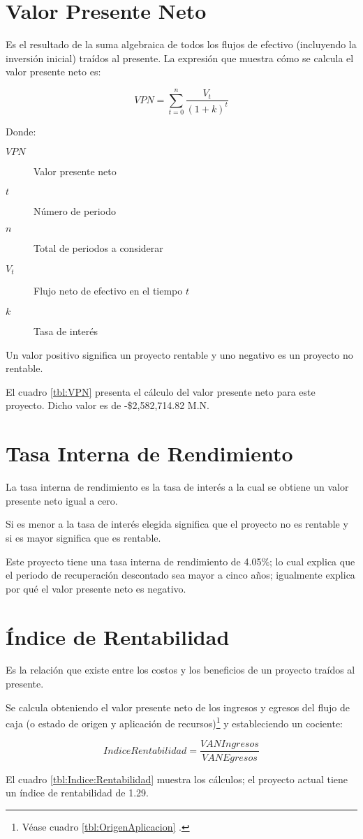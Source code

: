 \section{Valor Presente Neto}

Es el resultado de la suma algebraica de todos los flujos de efectivo (incluyendo la inversión inicial) traídos al presente. La expresión que muestra cómo se calcula el valor presente neto es:

$$VPN = \sum_{t=0}^{n}{\frac{V_t}{\left(1+k\right)^t}}$$

Donde:

\begin{description}
	\item[$VPN$] Valor presente neto
	\item[$t$] Número de periodo
	\item[$n$] Total de periodos a considerar
	\item[$V_t$] Flujo neto de efectivo en el tiempo $t$
	\item[$k$] Tasa de interés
\end{description}

Un valor positivo significa un proyecto rentable y uno negativo es un proyecto no rentable.

El cuadro \ref{tbl:VPN} presenta el cálculo del valor presente neto para este proyecto. Dicho valor es de -\$2,582,714.82 M.N.



\section{Tasa Interna de Rendimiento}

La tasa interna de rendimiento es la tasa de interés a la cual se obtiene un valor presente neto igual a cero.

Si es menor a la tasa de interés elegida significa que el proyecto no es rentable y si es mayor significa que es rentable.

Este proyecto tiene una tasa interna de rendimiento de 4.05\%; lo cual explica que el periodo de recuperación descontado sea mayor a cinco años; igualmente explica por qué el valor presente neto es negativo.

\section{Índice de Rentabilidad}

Es la relación que existe entre los costos y los beneficios de un proyecto traídos al presente.

Se calcula obteniendo el valor presente neto de los ingresos y egresos del flujo de caja (o estado de origen y aplicación de recursos)\footnote{Véase cuadro \ref{tbl:OrigenAplicacion} \pageref{tbl:OrigenAplicacion}.} y estableciendo un cociente:

$$Indice Rentabilidad = \frac{VAN Ingresos}{VAN Egresos} $$

El cuadro \ref{tbl:Indice:Rentabilidad} muestra los cálculos; el proyecto actual tiene un índice de rentabilidad de 1.29.


